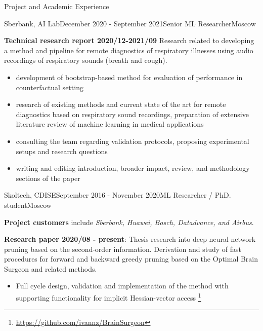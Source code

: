 \documentclass{resume} %
\begin{document}
\begin{rSection}{Project and Academic Experience}
\begin{rSubsection}{Sberbank, AI Lab}{December 2020 - September 2021}{Senior ML Researcher}{Moscow}
    \item \textbf{Technical research report 2020/12-2021/09}
    Research related to developing a method and pipeline for remote diagnostics of respiratory
    illnesses using audio recordings of respiratory sounds (breath and cough).
    \begin{itemize}
        \item development of bootstrap-based method for evaluation of performance in
        counterfactual setting  %
        
        \item research of existing methods and current state of the art for remote diagnostics
        based on respiratory sound recordings, preparation of extensive literature review of
        machine learning in medical applications
        
        \item consulting the team regarding validation protocols, proposing experimental
        setups and research questions
        
        \item writing and editing introduction, broader impact, review, and methodology sections 
        of the paper
    \end{itemize}
\end{rSubsection}

\begin{rSubsection}{Skoltech, CDISE}{September 2016 - November 2020}{ML Researcher / PhD. student}{Moscow}
    \item \textbf{Project customers} include \emph{Sberbank, Huawei, Bosch, Datadvance, and Airbus}.

    \bigskip
    \item \textbf{Research paper 2020/08 - present}:
    Thesis research into deep neural network pruning based on the second-order information.
    Derivation and study of fast procedures for forward and backward greedy pruning based
    on the Optimal Brain Surgeon and related methods.
    \begin{itemize}
        \item Full cycle design, validation and implementation of the method with supporting
        functionality for implicit Hessian-vector access%
            \footnote{\url{https://github.com/ivannz/BrainSurgeon}}


\end{itemize}
\end{rSubsection}
\end{rSection}
\end{document}
